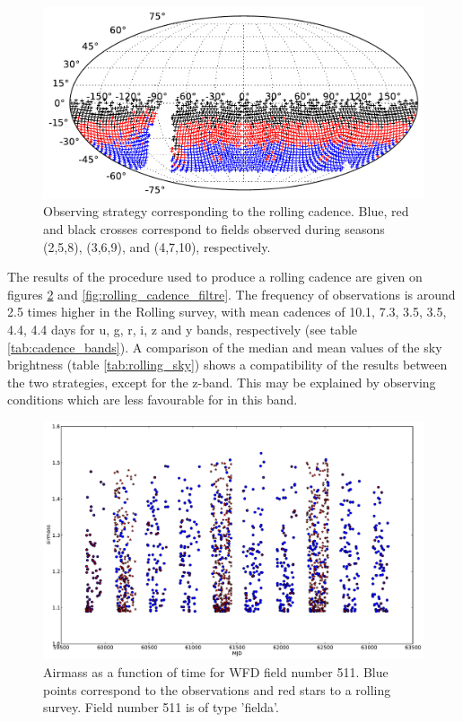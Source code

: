 \documentclass[\docopts]{\docclass}
\begin{document}
\begin{figure}[t]
  \begin{center}
    \includegraphics[width=\linewidth]{figures/Rolling_fields.pdf}
    \caption{Observing strategy corresponding to the rolling
      cadence. Blue, red and black crosses correspond to fields
      observed during seasons (2,5,8), (3,6,9), and
      (4,7,10), respectively.}
    \label{fig:rolling_strategy}
  \end{center}
\end{figure}


The results of the procedure used to produce a rolling cadence are
given on figures \ref{fig:rolling_airmass} and
\ref{fig:rolling_cadence_filtre}. The frequency of observations is around 2.5 times higher
in the Rolling survey, with mean cadences of 10.1, 7.3, 3.5, 3.5, 4.4,
4.4 days for u, g, r, i, z and y bands,
respectively (see table \ref{tab:cadence_bands}). A comparison of the
median and mean values of the sky brightness (table
\ref{tab:rolling_sky}) shows a compatibility of the results between
the two strategies, except for the z-band. This may be explained by
observing conditions which are less favourable for 
in this band. 


\begin{figure}[t]
  \begin{center}
    \includegraphics[width=\linewidth]{figures/Airmass_vs_mjd_511.pdf}
    \caption{Airmass as a function of time for WFD field number
      511. Blue points correspond to the 
      observations and red stars to a rolling survey. Field number 511
    is of type 'fielda'.}
    \label{fig:rolling_airmass}
  \end{center}
\end{figure}
\end{document}
